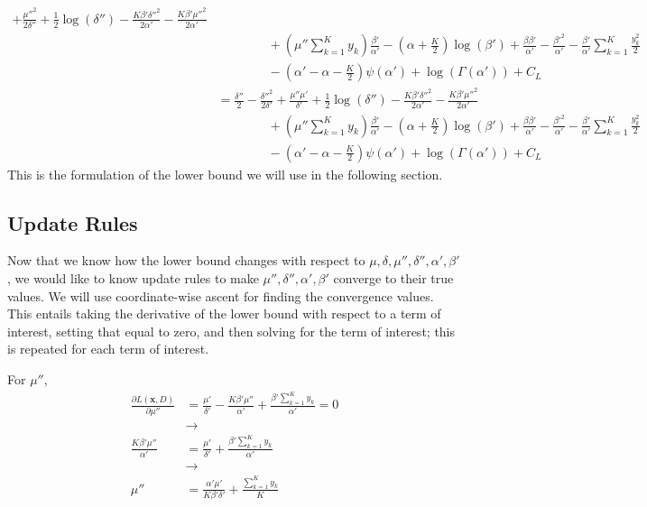 \documentclass[12pt]{article}
\begin{document}
\begin{appendices}
\begin{align}
    + \frac{\mu''^{2}}{2\delta''} + \frac{1}{2}\log{(\delta'')}
    -\frac{K\beta'\delta''^2}{2\alpha'}
    - \frac{K\beta'\mu''^{2}}{2\alpha'}
    \nonumber \\
    &\quad\quad\quad\quad
    +(\mu''\sum_{k=1}^{K}y_{k})\frac{\beta'}{\alpha'}
    - (\alpha+\frac{K}{2})\log(\beta')
    + \frac{\beta\beta'}{\alpha'}-\frac{\beta'^2}{\alpha'}-\frac{\beta'}{\alpha'}\sum_{k=1}^{K}\frac{y_{k}^2}{2}
    \nonumber \\
    &\quad\quad\quad\quad
    -(\alpha'-\alpha-\frac{K}{2})\psi(\alpha')
    + \log{(\Gamma(\alpha'))}
    + C_L
    \nonumber \\
    &=
    \frac{\delta''}{2}-\frac{\delta''^2}{2\delta'}
    + \frac{\mu''\mu'}{\delta'}
    + \frac{1}{2}\log{(\delta'')}
    -\frac{K\beta'\delta''^2}{2\alpha'}
    - \frac{K\beta'\mu''^{2}}{2\alpha'}
    \nonumber \\
    &\quad\quad\quad\quad
    +(\mu''\sum_{k=1}^{K}y_{k})\frac{\beta'}{\alpha'}
    - (\alpha+\frac{K}{2})\log(\beta')
    + \frac{\beta\beta'}{\alpha'}-\frac{\beta'^2}{\alpha'}-\frac{\beta'}{\alpha'}\sum_{k=1}^{K}\frac{y_{k}^2}{2}
    \nonumber \\
    &\quad\quad\quad\quad
    -(\alpha'-\alpha-\frac{K}{2})\psi(\alpha')
    + \log{(\Gamma(\alpha'))}
    + C_L
\end{align}
This is the formulation of the lower bound we will use in the following section.

\subsection{Update Rules}

Now that we know how the lower bound changes with respect to $\mu, \delta,
\mu'', \delta'', \alpha', \beta'$, we would like to know update rules to make
$\mu'', \delta'', \alpha', \beta'$ converge to their true values.  We will use
coordinate-wise ascent for finding the convergence values.  This entails taking
the derivative of the lower bound with respect to a term of interest, setting
that equal to zero, and then solving for the term of interest; this is repeated
for each term of interest.

For $\mu''$,
\begin{align}
    \frac{\partial L(\bm{x}, D)}{\partial \mu''} &=
    \frac{\mu'}{\delta'}
    - \frac{K\beta'\mu''}{\alpha'} + \frac{\beta'\sum_{k=1}^{K}y_{k}}{\alpha'}
    = 0
    \nonumber \\
    &\rightarrow
    \nonumber \\
    \frac{K\beta'\mu''}{\alpha'} &= \frac{\mu'}{\delta'}
    + \frac{\beta'\sum_{k=1}^{K}y_{k}}{\alpha'}
    \nonumber \\
    &\rightarrow
    \nonumber \\
    \mu'' &= \frac{\alpha'\mu'}{K\beta'\delta'}
    + \frac{\sum_{k=1}^{K}y_{k}}{K}
\end{align}


\end{appendices}
\end{document}
